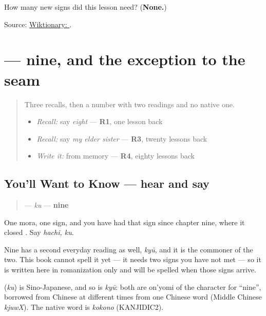 \begin{tcolorbox}[breakable,colback=teal!4,colframe=teal!35!black,title={Before you move on}]
How many new signs did this lesson need? (\textbf{None.})

Source: \href{https://en.wiktionary.org/wiki/\%E3\%81\%AF\%E3\%81\%A1}{Wiktionary: }.
\end{tcolorbox}
\section[\texorpdfstring{\ja{く} (ku)}{く (ku)}]{ — nine, and the exception to the seam}

\label{lesson:JA-C15-ku}



\begin{quote}
Three recalls, then a number with two readings and no native one.

\begin{itemize}
\raggedright
  \item \emph{Recall:} say \emph{eight} — \textbf{R1}, one lesson back
  \item \emph{Recall:} say \emph{my elder sister} — \textbf{R3}, twenty lessons back
  \item \emph{Write it:} \textbf{} from memory — \textbf{R4}, eighty lessons back
\end{itemize}
\end{quote}

\subsection*{You'll Want to Know — hear and say}
\begin{quote}
\textbf{} — \emph{ku} — \textbf{nine}
\end{quote}

One mora, one sign, and you have had that sign since chapter nine, where it closed \textbf{}. Say \emph{hachi, ku}.

Nine has a second everyday reading as well, \emph{kyū}, and it is the commoner of the two. This book cannot spell it yet — it needs two signs you have not met — so it is written here in romanization only and will be spelled when those signs arrive.

\begin{cousinweb}
\textbf{} (\emph{ku}) is Sino-Japanese, and so is \emph{kyū}: both are on'yomi of the character for \textquotedblleft{}nine\textquotedblright{}, borrowed from Chinese at different times from one Chinese word (Middle Chinese \emph{kjuwX}). The native word is \emph{kokono} (KANJIDIC2).
\end{cousinweb}

